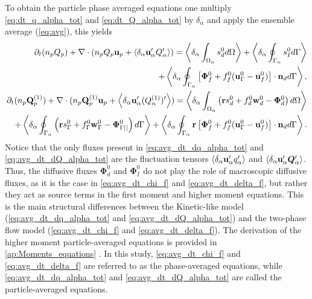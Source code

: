 To obtain the particle phase averaged equations one multiply \ref{eq:dt_q_alpha_tot} and \ref{eq:dt_Q_alpha_tot} by $\delta_\alpha$ and apply the ensemble average (\ref{eq:avg}), this yields
\begin{align}
    \partial_t (n_pQ_p)
    + \mathbf{\nabla}\cdot (n_p Q_p \textbf{u}_p + \left<\delta_\alpha \textbf{u}_\alpha' Q_\alpha'\right>)
    = \left<\delta_\alpha \int_{\Omega_{\alpha}}  s_d^0  d\Omega\right>
    + \left<\delta_\alpha \oint_{\Gamma_{\alpha}}  s_I^0  d\Gamma\right>\nonumber\\
    + \left<\delta_\alpha \oint_{\Gamma_{\alpha}}  \left[\mathbf{\Phi}_f^0 + f_f^0 (\textbf{u}_\Gamma^0-\textbf{u}_f^0) \right] \cdot \textbf{n}_d  d\Gamma\right>,
    \label{eq:avg_dt_dq_alpha_tot}\\
    \partial_t (n_p\textbf{Q}_p^{(1)})
    + \mathbf{\nabla}\cdot (n_p \textbf{Q}_p^{(1)} \textbf{u}_p + \left<\delta_\alpha \textbf{u}_\alpha' (Q_\alpha^{(1)})'\right>)
    =\left<\delta_\alpha \int_{\Omega_{\alpha}}  \left(
        \textbf{r} s_d^0         
        + f_d^0  \textbf{w}_d^0 
        - \mathbf{\Phi}_d^0
    \right)  d\Omega\right>\nonumber\\
    + \left<\delta_\alpha \oint_{\Gamma_{\alpha}}  \left(
        \textbf{r}s_\Gamma^0
        + f_\Gamma^0 \textbf{w}_\Gamma^0
        - \mathbf{\Phi}_{\Gamma||}^0
    \right)  d\Gamma\right>
    + \left<\delta_\alpha \oint_{\Gamma_{\alpha}}  \textbf{r} \left[
        \mathbf{\Phi}_f^0
        + f_f^0 (\textbf{u}_\Gamma^0-\textbf{u}_f^0)
    \right]\cdot \textbf{n}_d   d\Gamma\right>.
    \label{eq:avg_dt_dQ_alpha_tot}
\end{align}
Notice that the only fluxes present in \ref{eq:avg_dt_dq_alpha_tot} and \ref{eq:avg_dt_dQ_alpha_tot} are the fluctuation tensors $\left<\delta_\alpha \textbf{u}_\alpha' q_\alpha'\right>$ and $\left<\delta_\alpha \textbf{u}_\alpha' \bm{Q}_\alpha'\right>$. 
Thus, the diffusive fluxes $\bm\Phi_d^0$ and $\bm\Phi_I^0$ do not play the role of macroscopic diffusive fluxes, as it is the case in \ref{eq:avg_dt_chi_f} and \ref{eq:avg_dt_delta_f}, but rather they act as source terms in the first moment and higher moment equations. 
This is the main structural differences between the Kinetic-like model (\ref{eq:avg_dt_dq_alpha_tot} and \ref{eq:avg_dt_dQ_alpha_tot}) and the two-phase flow model (\ref{eq:avg_dt_chi_f} and \ref{eq:avg_dt_delta_f}). 
The derivation of the higher moment particle-averaged equations is provided in \ref{ap:Moments_equations} . 
In this study, \ref{eq:avg_dt_chi_f} and \ref{eq:avg_dt_delta_f} are referred to as the phase-averaged equations, while \ref{eq:avg_dt_dq_alpha_tot} and \ref{eq:avg_dt_dQ_alpha_tot} are called the particle-averaged equations. 

 



